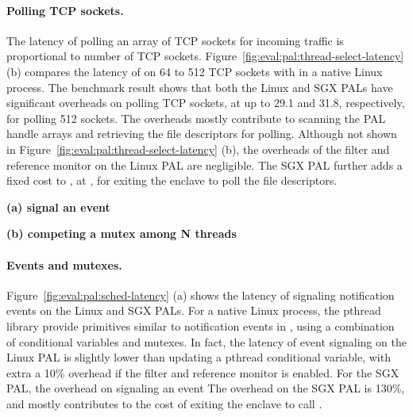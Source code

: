 \paragraph{Polling TCP sockets.}
The latency of polling an array of TCP sockets for incoming traffic
is proportional to
number of TCP sockets.
Figure~\ref{fig:eval:pal:thread-select-latency} (b)
compares the latency of
 on 64 to 512 TCP sockets
with 
in a native Linux process.
The benchmark result shows that both the Linux and SGX PALs
have significant overheads
on polling TCP sockets, at up to 29.1\usec{} and 31.8\usec{}, respectively, for polling 512 sockets.
The overheads mostly contribute to
scanning the PAL handle arrays and retrieving
the file descriptors for polling.
Although not shown in Figure~\ref{fig:eval:pal:thread-select-latency} (b),
the overheads
of the \seccomp{} filter and reference monitor on the Linux PAL
are negligible.
The SGX PAL further adds a fixed cost to ,
at \usec{},
for exiting the enclave to poll the file descriptors.





\begin{figure*}[t!]
\centering
\footnotesize
{}
\parbox{0.49\textwidth}{\centering\bf (a) signal an event}
\parbox{0.49\textwidth}{\centering\bf (b) competing a mutex among N threads}
\caption{Latency of (a) signaling an event and (b) competing a mutex among N threads (N: 1 to 8).
Lower is better.
The comparison is between (1) pthread condition variables and mutexes on Linux; (2) Notification events and mutexes on the Linux PAL, with and without a \seccomp{} filter ({\bf +SC}) and reference monitor ({\bf +RM}); (3) the same abstractions on the SGX PAL.}
\label{fig:eval:pal:sched-latency}
\end{figure*}




\paragraph{Events and mutexes.}
Figure~\ref{fig:eval:pal:sched-latency} (a)
shows the latency of signaling notification events
on the Linux and SGX PALs.
For a native Linux process, the pthread library
provide primitives similar to notification events in \thehostabi{},
using a combination
of conditional variables and mutexes.
In fact, the latency of event signaling on the Linux PAL
is slightly lower than updating a pthread conditional variable,
with extra a \roughly{}10\% overhead
if the \seccomp{} filter and reference monitor is enabled.
For the SGX PAL, the overhead on signaling an event
The overhead on the SGX PAL
is \roughly{}130\%,
and mostly contributes to the cost of exiting the enclave to call .




